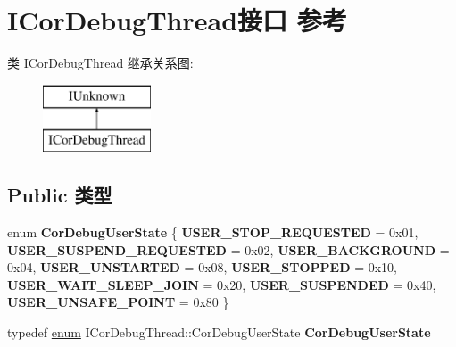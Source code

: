 \hypertarget{interface_i_cor_debug_thread}{}\section{I\+Cor\+Debug\+Thread接口 参考}
\label{interface_i_cor_debug_thread}
类 I\+Cor\+Debug\+Thread 继承关系图\+:\begin{figure}[H]
\begin{center}
\leavevmode
\includegraphics[height=2.000000cm]{interface_i_cor_debug_thread}
\end{center}
\end{figure}
\subsection*{Public 类型}
\begin{DoxyCompactItemize}
\item 
\mbox{\label{interface_i_cor_debug_thread_a81f9476553bba2046ff008a85a003a29}} 
enum {\bfseries Cor\+Debug\+User\+State} \{ \newline
{\bfseries U\+S\+E\+R\+\_\+\+S\+T\+O\+P\+\_\+\+R\+E\+Q\+U\+E\+S\+T\+ED} = 0x01, 
{\bfseries U\+S\+E\+R\+\_\+\+S\+U\+S\+P\+E\+N\+D\+\_\+\+R\+E\+Q\+U\+E\+S\+T\+ED} = 0x02, 
{\bfseries U\+S\+E\+R\+\_\+\+B\+A\+C\+K\+G\+R\+O\+U\+ND} = 0x04, 
{\bfseries U\+S\+E\+R\+\_\+\+U\+N\+S\+T\+A\+R\+T\+ED} = 0x08, 
\newline
{\bfseries U\+S\+E\+R\+\_\+\+S\+T\+O\+P\+P\+ED} = 0x10, 
{\bfseries U\+S\+E\+R\+\_\+\+W\+A\+I\+T\+\_\+\+S\+L\+E\+E\+P\+\_\+\+J\+O\+IN} = 0x20, 
{\bfseries U\+S\+E\+R\+\_\+\+S\+U\+S\+P\+E\+N\+D\+ED} = 0x40, 
{\bfseries U\+S\+E\+R\+\_\+\+U\+N\+S\+A\+F\+E\+\_\+\+P\+O\+I\+NT} = 0x80
 \}
\item 
\mbox{\label{interface_i_cor_debug_thread_a1ecc1c2f0025681b59cd4d284537a165}} 
typedef \hyperlink{interfaceenum}{enum} I\+Cor\+Debug\+Thread\+::\+Cor\+Debug\+User\+State {\bfseries Cor\+Debug\+User\+State}
\end{DoxyCompactItemize}
